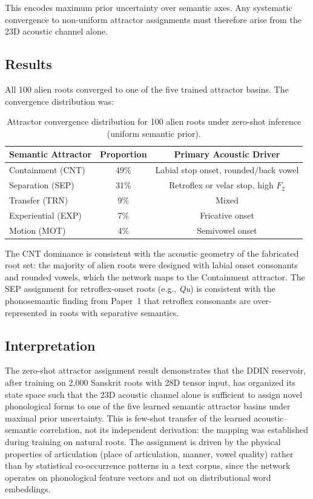 \documentclass{article}
\begin{document}
This encodes maximum prior uncertainty over semantic axes. Any systematic convergence
to non-uniform attractor assignments must therefore arise from the 23D acoustic channel
alone.

\subsection{Results}

All 100 alien roots converged to one of the five trained attractor basins. The
convergence distribution was:

\begin{table}[h]
\centering
\begin{tabular}{lcc}
\toprule
Semantic Attractor & Proportion & Primary Acoustic Driver \\
\midrule
Containment (CNT) & 49\% & Labial stop onset, rounded/back vowel \\
Separation (SEP) & 31\% & Retroflex or velar stop, high $F_2$ \\
Transfer (TRN) & 9\%  & Mixed \\
Experiential (EXP) & 7\%  & Fricative onset \\
Motion (MOT) & 4\%  & Semivowel onset \\
\bottomrule
\end{tabular}
\caption{Attractor convergence distribution for 100 alien roots under zero-shot
inference (uniform semantic prior).}
\label{tab:zeroshot}
\end{table}

The CNT dominance is consistent with the acoustic geometry of the fabricated root set:
the majority of alien roots were designed with labial onset consonants and rounded
vowels, which the network maps to the Containment attractor. The SEP assignment for
retroflex-onset roots (e.g., \textit{Qu}) is consistent with the phonosemantic finding
from Paper~1 that retroflex consonants are over-represented in roots with separative
semantics.

\subsection{Interpretation}

The zero-shot attractor assignment result demonstrates that the DDIN reservoir, after
training on 2,000 Sanskrit roots with 28D tensor input, has organized its state space
such that the 23D acoustic channel alone is sufficient to assign novel phonological
forms to one of the five learned semantic attractor basins under maximal prior
uncertainty. This is few-shot transfer of the learned acoustic--semantic correlation,
not its independent derivation: the mapping was established during training on natural
roots. The assignment is driven by the physical properties of articulation (place of
articulation, manner, vowel quality) rather than by statistical co-occurrence patterns
in a text corpus, since the network operates on phonological feature vectors and not on
distributional word embeddings.
\end{document}
